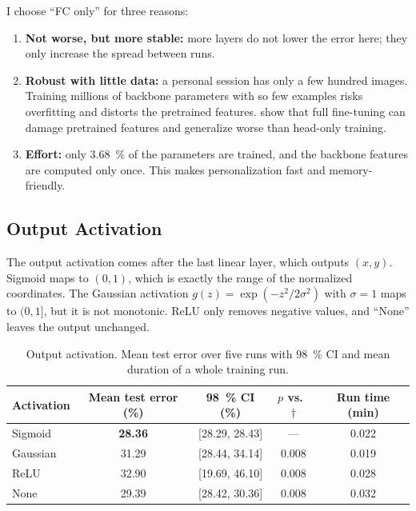 I choose \enquote{FC only} for three reasons:
\begin{enumerate}[nosep]
  \item \textbf{Not worse, but more stable:} more layers do not lower the error
        here; they only increase the spread between runs.
  \item \textbf{Robust with little data:} a personal session has only a few
        hundred images. Training millions of backbone parameters with so few
        examples risks overfitting and distorts the pretrained features.
        \citet{kumar2022finetuning} show that full fine-tuning can damage
        pretrained features and generalize worse than head-only training.
  \item \textbf{Effort:} only \SI{3.68}{\percent} of the parameters are
        trained, and the backbone features are computed only once. This makes
        personalization fast and memory-friendly.
\end{enumerate}

\subsection{Output Activation}
\label{sec:activation}

The output activation comes after the last linear layer, which outputs $(x,y)$.
Sigmoid maps to $(0,1)$, which is exactly the range of the normalized
coordinates. The Gaussian activation $g(z)=\exp(-z^2/2\sigma^2)$ with $\sigma=1$
maps to $(0,1]$, but it is not monotonic. ReLU only removes negative values, and
\enquote{None} leaves the output unchanged.

\begin{table}[htbp]
  \centering
  \caption[Output activation]{Output activation. Mean test error over five runs with
           \SI{98}{\percent} CI and mean duration of a whole training run.}
  \label{tab:activation}
  \small
  \begin{tabular}{lcccc}
    \toprule
    Activation & Mean test error (\%) & \SI{98}{\percent} CI (\%) & $p$ vs.\ $\dagger$ & Run time (min) \\
    \midrule
    Sigmoid\sel{}    & \textbf{28.36} & [28.29, 28.43] & ---   & 0.022 \\
    Gaussian         & 31.29 & [28.44, 34.14] & 0.008 & 0.019 \\
    ReLU             & 32.90 & [19.69, 46.10] & 0.008 & 0.028 \\
    None             & 29.39 & [28.42, 30.36] & 0.008 & 0.032 \\
    \bottomrule
  \end{tabular}
\end{table}

